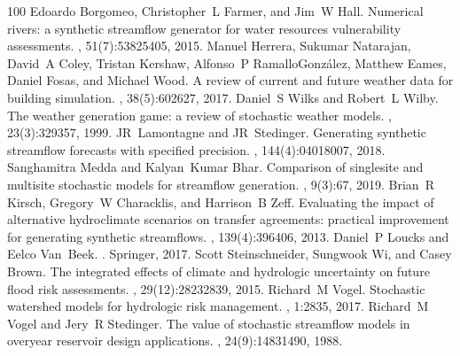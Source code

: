 \documentclass[letterpaper,10pt,english]{sphinxmanual}
\begin{document}
\begin{sphinxthebibliography}{100}
\sphinxAtStartPar
Edoardo Borgomeo, Christopher L Farmer, and Jim W Hall. Numerical rivers: a synthetic streamflow generator for water resources vulnerability assessments. , 51(7):5382\textendash{}5405, 2015.
\sphinxAtStartPar
Manuel Herrera, Sukumar Natarajan, David A Coley, Tristan Kershaw, Alfonso P Ramallo\sphinxhyphen{}González, Matthew Eames, Daniel Fosas, and Michael Wood. A review of current and future weather data for building simulation. , 38(5):602\textendash{}627, 2017.
\sphinxAtStartPar
Daniel S Wilks and Robert L Wilby. The weather generation game: a review of stochastic weather models. , 23(3):329\textendash{}357, 1999.
\sphinxAtStartPar
JR Lamontagne and JR Stedinger. Generating synthetic streamflow forecasts with specified precision. , 144(4):04018007, 2018.
\sphinxAtStartPar
Sanghamitra Medda and Kalyan Kumar Bhar. Comparison of single\sphinxhyphen{}site and multi\sphinxhyphen{}site stochastic models for streamflow generation. , 9(3):67, 2019.
\sphinxAtStartPar
Brian R Kirsch, Gregory W Characklis, and Harrison B Zeff. Evaluating the impact of alternative hydro\sphinxhyphen{}climate scenarios on transfer agreements: practical improvement for generating synthetic streamflows. , 139(4):396\textendash{}406, 2013.
\sphinxAtStartPar
Daniel P Loucks and Eelco Van Beek. . Springer, 2017.
\sphinxAtStartPar
Scott Steinschneider, Sungwook Wi, and Casey Brown. The integrated effects of climate and hydrologic uncertainty on future flood risk assessments. , 29(12):2823\textendash{}2839, 2015.
\sphinxAtStartPar
Richard M Vogel. Stochastic watershed models for hydrologic risk management. , 1:28\textendash{}35, 2017.
\sphinxAtStartPar
Richard M Vogel and Jery R Stedinger. The value of stochastic streamflow models in overyear reservoir design applications. , 24(9):1483\textendash{}1490, 1988.

\end{sphinxthebibliography}
\end{document}
